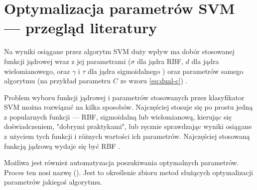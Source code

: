 \section{Optymalizacja parametrów SVM --- przegląd literatury}
Na wyniki osiągane przez algorytm SVM duży wpływ ma dobór stosowanej funkcji jądrowej wraz z jej parametrami ($ \sigma $ dla jądra RBF, $ d $ dla jądra wielomianowego, oraz $ \gamma $ i $ \tau $ dla jądra sigmoidalnego ) oraz parametrów samego algorytmu (na przykład parametru $ C $ ze wzoru \ref{eq:dual-c}) \cite{practical_2003}. 

Problem wyboru funkcji jądrowej i parametrów stosowanych przez klasyfikator SVM można rozwiązać na kilka sposobów. Najczęściej stosuje się po prostu jedną z popularnych funkcji --- RBF, sigmoidalną lub wielomianową, kierując się doświadczeniem, "dobrymi praktykami", lub ręcznie sprawdzając wyniki osiągane z użyciem tych funkcji i różnych wartości ich parametrów. Najczęściej stosowaną funkcją jądrową wydaje się być RBF \cite{practical_2003} \cite{howley_genetic_2005}.

Możliwa jest również automatyzacja poszukiwania optymalnych parametrów. Proces ten nosi nazwę  (). Jest to określenie zbioru metod służących optymalizacji parametrów jakiegoś algorytmu.

